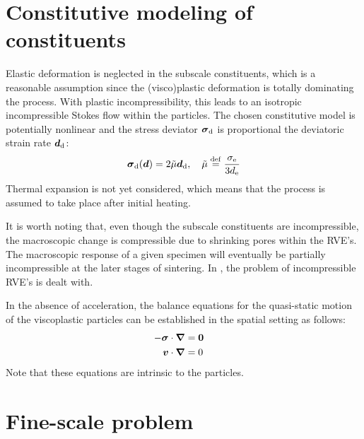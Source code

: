\documentclass[MikaelDissertation.tex]{subfiles}
\begin{document}
\section{Constitutive modeling of constituents}
Elastic deformation is neglected in the subscale constituents, which is a reasonable assumption since the (visco)plastic deformation is totally dominating the process.
With plastic incompressibility, this leads to an isotropic incompressible Stokes flow within the particles.
The chosen constitutive model is potentially nonlinear and the stress deviator $\boldsymbol{\sigma}_{\mathrm{d}}$ is proportional the deviatoric strain rate $\boldsymbol{d}_{\mathrm{d}}$:
\begin{equation}
    \boldsymbol{\sigma}_{\mathrm{d}}(\boldsymbol{d}) = 2\tilde{\mu}\boldsymbol{d}_{\mathrm{d}}, \quad
    \tilde{\mu}\overset{\mathrm{def}}{=} \frac{\sigma_{\mathrm{e}}}{3d_{\mathrm{e}}}
\end{equation}
Thermal expansion is not yet considered, which means that the process is assumed to take place after initial heating.

It is worth noting that, even though the subscale constituents are incompressible, the macroscopic change is compressible due to shrinking pores within the RVE's. The macroscopic response of a given specimen will eventually be partially incompressible at the later stages of sintering. 
In , the problem of incompressible RVE's is dealt with.

In the absence of acceleration, the balance equations for the quasi-static motion of the viscoplastic particles can be established in the spatial setting as follows:
\begin{subequations}\label{eq:stokesflow}
\begin{align}
    -\ts{\sigma}\cdot\diff & = \ts{0} \quad%
\label{eq:stokesflow_momentum}
\\
    \ta{v}\cdot\diff & = 0 \quad%
\label{eq:stokesflow_continuity}
\end{align}
\end{subequations}
Note that these equations are intrinsic to the particles.

\section{Fine-scale problem}
\end{document}
